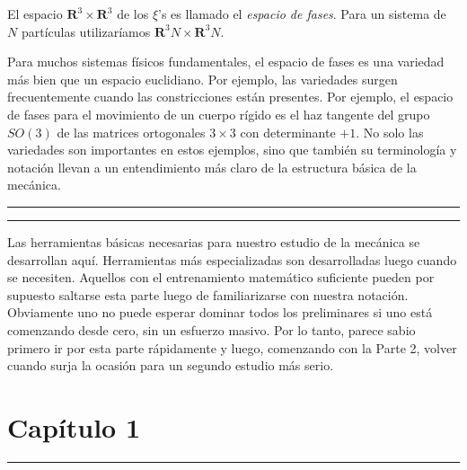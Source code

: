 \documentclass[a4paper,10pt]{article}
\numberwithin{equation}{section}
\begin{document}
\vspace{.3cm}

El espacio $\mathbf{R}^3\times\mathbf{R}^3$ de los $\xi$'s es llamado el \emph{espacio de 
fases}. Para un sistema de $N$ partículas utilizaríamos $\mathbf{R}^3N\times\mathbf{R}^3N$. 

\vspace{.3cm}

Para muchos sistemas físicos fundamentales, el espacio de fases es una variedad más bien 
que un espacio euclidiano. Por ejemplo, las variedades surgen frecuentemente cuando 
las constricciones están presentes. Por ejemplo, el espacio de fases para el movimiento 
de un cuerpo rígido es el haz tangente del grupo $SO(3)$ de las matrices ortogonales 
$3 \times 3$ con determinante $+1$. No solo las variedades son importantes en estos
ejemplos, sino que también su terminología y notación llevan a un entendimiento más 
claro de la estructura básica de la mecánica.

\newpage


\vspace{.3cm}

\noindent\rule[0.5ex]{.55\linewidth}{1pt}


\noindent\rule[0.5ex]{.55\linewidth}{1pt}

\vspace{4cm}

Las herramientas básicas necesarias para nuestro estudio de la mecánica se desarrollan
aquí. Herramientas más especializadas son desarrolladas luego cuando se necesiten. 
Aquellos con el entrenamiento matemático suficiente pueden por supuesto saltarse
esta parte luego de familiarizarse con nuestra notación. Obviamente uno no puede 
esperar dominar todos los preliminares si uno está comenzando desde cero, sin un 
esfuerzo masivo. Por lo tanto, parece sabio primero ir por esta parte rápidamente y 
luego, comenzando con la Parte 2, volver cuando surja la ocasión para un segundo 
estudio más serio.



\newpage 

\section{{\huge{Capítulo 1}}}

\noindent\rule[0.5ex]{\linewidth}{1pt}
\end{document}
